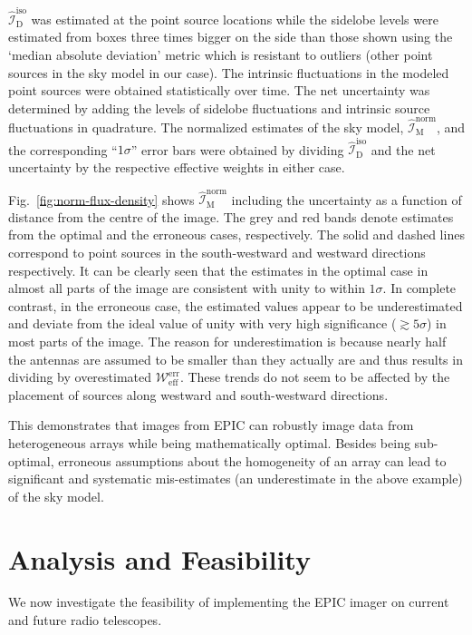 \documentclass[a4paper,fleqn,usenatbib]{mnras}
\begin{document}
$\widehat{\mathcal{I}}_\textrm{D}^\textrm{iso}$ was estimated at the point source locations while the sidelobe levels were estimated from boxes three times bigger on the side than those shown using the `median absolute deviation' metric which is resistant to outliers (other point sources in the sky model in our case). The intrinsic fluctuations in the modeled point sources were obtained statistically over time. The net uncertainty was determined by adding the levels of sidelobe fluctuations and intrinsic source fluctuations in quadrature. The normalized estimates of the sky model, $\widehat{\mathcal{I}}_\textrm{M}^\textrm{norm}$, and the corresponding ``$1\sigma$'' error bars were obtained by dividing $\widehat{\mathcal{I}}_\textrm{D}^\textrm{iso}$ and the net uncertainty by the respective effective weights in either case. 

Fig.~\ref{fig:norm-flux-density} shows $\widehat{\mathcal{I}}_\textrm{M}^\textrm{norm}$ including the uncertainty as a function of distance from the centre of the image. The grey and red bands denote estimates from the optimal and the erroneous cases, respectively. The solid and dashed lines correspond to point sources in the south-westward and westward directions respectively. It can be clearly seen that the estimates in the optimal case in almost all parts of the image are consistent with unity to within $1\sigma$. In complete contrast, in the erroneous case, the estimated values appear to be underestimated and deviate from the ideal value of unity with very high significance ($\gtrsim 5\sigma$) in most parts of the image. The reason for underestimation is because nearly half the antennas are assumed to be smaller than they actually are and thus results in dividing by overestimated $\mathcal{W}_\textrm{eff}^\textrm{err}$. These trends do not seem to be affected by the placement of sources along westward and south-westward directions. 

This demonstrates that images from EPIC can robustly image data from heterogeneous arrays while being mathematically optimal. Besides being sub-optimal, erroneous assumptions about the homogeneity of an array can lead to significant and systematic mis-estimates (an underestimate in the above example) of the sky model.

\section{Analysis and Feasibility}\label{sec:analysis}

We now investigate the feasibility of implementing the EPIC imager on current and future radio telescopes. 
\end{document}
